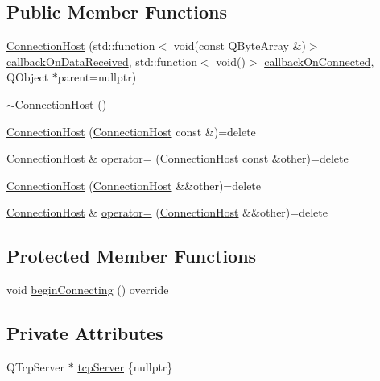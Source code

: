 \subsection*{Public Member Functions}
\begin{DoxyCompactItemize}
\item 
\hyperlink{classMODEL_1_1ConnectionHost_aa640c695c3148eaf447b1204c1d6af77}{Connection\+Host} (std\+::function$<$ void(const Q\+Byte\+Array \&)$>$ \hyperlink{classMODEL_1_1Connection_aa0b44072225e1b07b646bd973719ac80}{callback\+On\+Data\+Received}, std\+::function$<$ void()$>$ \hyperlink{classMODEL_1_1Connection_a0cb35149e127dbce2a09f0ac5d5cfc16}{callback\+On\+Connected}, Q\+Object $\ast$parent=nullptr)
\item 
\hyperlink{classMODEL_1_1ConnectionHost_af256b1f5783889ef9b3d78015b98807c}{$\sim$\+Connection\+Host} ()
\item 
\hyperlink{classMODEL_1_1ConnectionHost_aaa81e7db67470298d4282efedbbfd199}{Connection\+Host} (\hyperlink{classMODEL_1_1ConnectionHost}{Connection\+Host} const \&)=delete
\item 
\hyperlink{classMODEL_1_1ConnectionHost}{Connection\+Host} \& \hyperlink{classMODEL_1_1ConnectionHost_a734c9df80c90ccd6acaab9a0d6d2a7f8}{operator=} (\hyperlink{classMODEL_1_1ConnectionHost}{Connection\+Host} const \&other)=delete
\item 
\hyperlink{classMODEL_1_1ConnectionHost_aee554c351828b430390c3227fdd717ea}{Connection\+Host} (\hyperlink{classMODEL_1_1ConnectionHost}{Connection\+Host} \&\&other)=delete
\item 
\hyperlink{classMODEL_1_1ConnectionHost}{Connection\+Host} \& \hyperlink{classMODEL_1_1ConnectionHost_afac3f49bd01c8e0b8236f8a329831bc6}{operator=} (\hyperlink{classMODEL_1_1ConnectionHost}{Connection\+Host} \&\&other)=delete
\end{DoxyCompactItemize}
\subsection*{Protected Member Functions}
\begin{DoxyCompactItemize}
\item 
void \hyperlink{classMODEL_1_1ConnectionHost_ac867d4f9a602bf9d11bf2c653cbf4fe4}{begin\+Connecting} () override
\end{DoxyCompactItemize}
\subsection*{Private Attributes}
\begin{DoxyCompactItemize}
\item 
Q\+Tcp\+Server $\ast$ \hyperlink{classMODEL_1_1ConnectionHost_a79c9047a78bc919910a66376a7c5bb4d}{tcp\+Server} \{nullptr\}
\end{DoxyCompactItemize}
